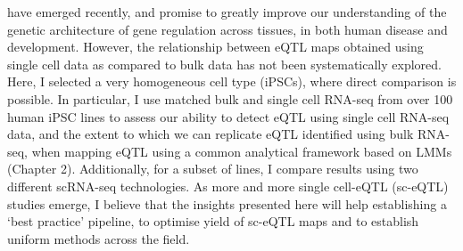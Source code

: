 have emerged recently, and promise
to greatly improve our understanding of the genetic architecture of 
gene regulation
across tissues, in both human disease and development.
However, the relationship between eQTL maps obtained using single cell data as compared to bulk data has not been systematically explored.
Here, I selected a very homogeneous cell type (iPSCs), where direct comparison is possible.
In particular,
I use matched bulk and single cell RNA-seq from over 100 human 
iPSC lines 
to assess our ability to detect 
eQTL
using single cell RNA-seq data, and the extent to which we can replicate 
eQTL
identified using bulk RNA-seq, when mapping eQTL using a common analytical framework based on LMMs (Chapter 2).
Additionally, for a subset of lines, I compare results using two different scRNA-seq technologies.
As more and more single cell-eQTL
(sc-eQTL) studies emerge, I believe that
the insights presented here will help
establishing a `best practice' pipeline, to optimise yield of sc-eQTL
maps and to establish uniform methods across the field.

\newpage

